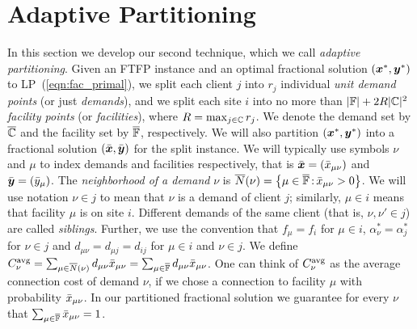 \documentclass[11pt]{article}
\begin{document}
\section{Adaptive Partitioning}
\label{sec: adaptive partitioning}

In this section we develop our second technique, which we call
\emph{adaptive partitioning}. Given an FTFP instance and an optimal
fractional solution $(\boldsymbol{x}^\ast, \boldsymbol{y}^\ast)$ to
LP~(\ref{eqn:fac_primal}), we split each client $j$ into $r_j$
individual \emph{unit demand points} (or just \emph{demands}), and we
split each site $i$ into no more than $|\mathbb{F}|+2R|\mathbb{C}|^2$
\emph{facility points} (or \emph{facilities}), where
$R=\max_{j\in\mathbb{C}}r_j$. We denote the demand set by $\overline{\mathbb{C}}$
and the facility set by $\overline{\mathbb{F}}$, respectively.  We will also
partition $(\boldsymbol{x}^\ast,\boldsymbol{y}^\ast)$ into a fractional solution
$(\bar{\boldsymbol{x}},\bar{\boldsymbol{y}})$ for the split instance.  We will typically use
symbols $\nu$ and $\mu$ to index demands and facilities respectively,
that is $\bar{\boldsymbol{x}} = ({\bar x}_{\mu\nu})$ and $\bar{\boldsymbol{y}} = ({\bar y}_{\mu})$.
The \emph{neighborhood of a demand} $\nu$ is
${\overline{N}}(\nu)={ \left\{ \mu\in\overline{\mathbb{F}} {\,:\,} {\bar x}_{\mu\nu}>0 \right\} }$.
We will use notation $\nu\in j$ to mean that $\nu$ is a demand of
client $j$; similarly, $\mu\in i$ means that facility $\mu$ is on site
$i$. Different demands of the same client (that is, $\nu,\nu'\in j$)
are called \emph{siblings}.  Further, we use the convention that
$f_\mu = f_i$ for $\mu\in i$, $\alpha_\nu^\ast = \alpha_j^\ast$ for
$\nu\in j$ and $d_{\mu\nu} = d_{\mu j} = d_{ij}$ for $\mu\in i$ and
$\nu\in j$.  We define $C^{{\mbox{\scriptsize\rm avg}}}_{\nu}
=\sum_{\mu\in{\overline{N}}(\nu)}d_{\mu\nu}{\bar x}_{\mu\nu} =
\sum_{\mu\in\overline{\mathbb{F}}}d_{\mu\nu}{\bar x}_{\mu\nu}$.  One can think of
$C^{{\mbox{\scriptsize\rm avg}}}_{\nu}$ as the average connection cost of demand $\nu$, if we
chose a connection to facility $\mu$ with probability
${\bar x}_{\mu\nu}$. In our partitioned fractional solution we guarantee
for every $\nu$ that $\sum_{\mu\in\overline{\mathbb{F}}} {\bar x}_{\mu\nu}=1$.
\end{document}
